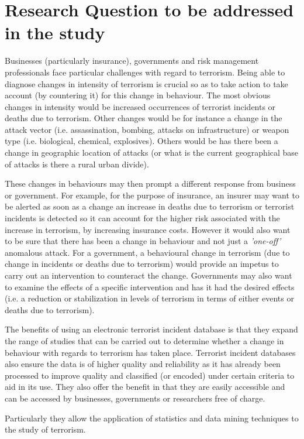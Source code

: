 \section{Research Question to be addressed in the study}
Businesses (particularly insurance), governments and risk management professionals face particular challenges with regard to terrorism. Being able to diagnose changes in intensity of terrorism is crucial so as to take action to take account (by countering it) for this change in behaviour. The most obvious changes in intensity would be increased occurrences of terrorist incidents or deaths due to terrorism. Other changes would be for instance a change in the attack vector (i.e. assassination, bombing, attacks on infrastructure) or weapon type (i.e. biological, chemical, explosives). Others would be has there been a change in geographic location of attacks (or what is the current geographical base of attacks is there a rural urban divide). 

These changes in behaviours may then prompt a different response from business or government. For example, for the purpose of insurance, an insurer may want to be alerted as soon as a change an increase in deaths due to terrorism or terrorist incidents is detected so it can account for the higher risk associated with the increase in terrorism, by increasing insurance costs. However it would also want to be sure that there has been a change in behaviour and not just a \textit{'one-off'} anomalous attack. For a government, a behavioural change in terrorism (due to change in incidents or deaths due to terrorism) would provide an impetus to carry out an intervention to counteract the change. Governments may also want to examine the effects of a specific intervention and has it had the desired effects (i.e. a reduction or stabilization in levels of terrorism in terms of either events or deaths due to terrorism). 

The benefits of using an electronic terrorist incident database is that they expand the range of studies that can be carried out to determine whether a change in behaviour with regards to terrorism has taken place. Terrorist incident databases also ensure the data is of higher quality and reliability as it has already been processed to improve quality and classified (or encoded) under certain criteria to aid in its use. They also offer the benefit in that they are easily accessible and can be accessed by businesses, governments or researchers free of charge. 

Particularly they allow the application of statistics and data mining techniques to the study of terrorism.

